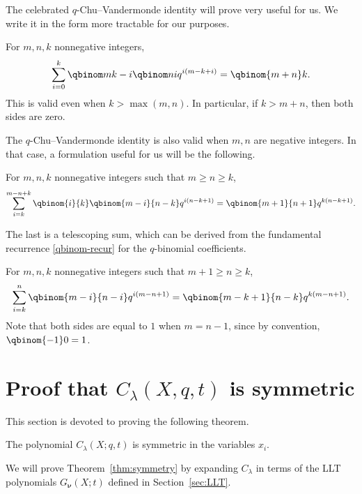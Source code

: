 The celebrated $q$-Chu--Vandermonde identity will prove very useful for us. 
We write it in the form more tractable for our purposes.

\begin{theorem}
\label{thm:q-chuvan}
For $m,n,k$ nonnegative integers,
\[
\sum_{i=0}^k \qbinom m{k-i} \qbinom ni q^{i(m-k+i)} = \qbinom {m+n}k.
\]
This is valid even when $k > \max(m,n)$. In particular, if $k > m+n$, then both sides are zero.
\end{theorem}

The $q$-Chu--Vandermonde identity is also valid when $m,n$ are negative
integers. In that case, a formulation useful for us will be the following.

\begin{cor}
\label{cor:q-dualchu}
For $m,n,k$ nonnegative integers such that $m \geq n \geq k$,
\[
\sum_{i=k}^{m-n+k} \qbinom {i}{k} \qbinom {m-i}{n-k} q^{i(n-k+1)} = \qbinom {m+1}{n+1} q^{k(n-k+1)}.
\]
\end{cor}


The last is a telescoping sum, which can be derived from the fundamental 
recurrence \eqref{qbinom-recur} for the $q$-binomial coefficients.

\begin{proposition}
\label{prop:q-telescope}
For $m,n,k$ nonnegative integers such that $m+1 \geq n \geq k$,
\[
\sum_{i=k}^n \qbinom {m-i}{n-i} q^{i(m-n+1)} = \qbinom {m-k+1}{n-k} q^{k(m-n+1)}.
\]
Note that both sides are equal to $1$ when $m = n-1$, since by convention, $\qbinom {-1}0 = 1$.
\end{proposition}


\section{Proof that $C_{\lambda}(X,q,t)$ is symmetric}
\label{sec:sym}

This section is devoted to proving the following theorem.

\begin{theorem}\label{thm:symmetry}
The polynomial $C_{\lambda}(X; q,t)$ is symmetric in the variables $x_i$.
\end{theorem}

We will prove Theorem~\ref{thm:symmetry} by expanding $C_{\lambda}$ in terms of the LLT polynomials $G_{\boldsymbol{\nu}}(X;t)$ 
defined in Section~\ref{sec:LLT}.

